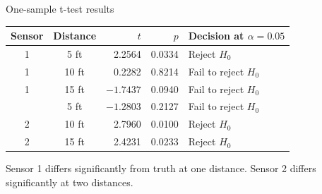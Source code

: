 \documentclass[aspectratio=169,14pt]{beamer}
\begin{document}
\begin{frame}{One-sample t-test results}
    \centering
    \small
    \begin{tabular}{ccrrl}
        \toprule
        Sensor & Distance & $t$ & $p$ & Decision at $\alpha=0.05$ \\
        \midrule
        1 & 5 ft  &  2.2564 & 0.0334 & Reject $H_0$ \\
        1 & 10 ft &  0.2282 & 0.8214 & Fail to reject $H_0$ \\
        1 & 15 ft & $-1.7437$ & 0.0940 & Fail to reject $H_0$ \\
        \addlinespace
        2 & 5 ft  & $-1.2803$ & 0.2127 & Fail to reject $H_0$ \\
        2 & 10 ft &  2.7960 & 0.0100 & Reject $H_0$ \\
        2 & 15 ft &  2.4231 & 0.0233 & Reject $H_0$ \\
        \bottomrule
    \end{tabular}

    \vspace{0.5cm}
    Sensor 1 differs significantly from truth at one distance. Sensor 2 differs significantly at two distances.
\end{frame}
\end{document}
